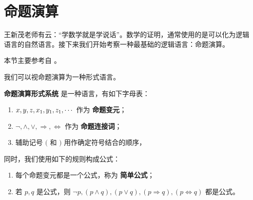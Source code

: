 \section{命题演算}

王新茂老师有云：“学数学就是学说话”。数学的证明，通常使用的是可以化为逻辑语言的自然语言。接下来我们开始考察一种最基础的逻辑语言：命题演算。

本节主要参考自 \cite[2.1]{wang18}。

我们可以视命题演算为一种形式语言。

\begin{definition}[命题演算形式系统] \label{def:命题演算形式系统}
  \textbf{命题演算形式系统} 是一种语言，有如下字母表：
  \begin{enumerate}
    \item \(x,y,z,x_1,y_1,z_1,\cdots{}\) 作为 \textbf{命题变元}；
    \item \(\lnot,\land,\lor,\Rightarrow,\Leftrightarrow\) 作为 \textbf{命题连接词}；
    \item 辅助记号 \((\) 和 \()\) 用作确定符号结合的顺序，
  \end{enumerate}
  同时，我们使用如下的规则构成公式：
  \begin{enumerate}
    \item 每个命题变元都是一个公式，称为 \textbf{简单公式}；
    \item 若 \(p,q\) 是公式，则 \(\lnot p,(p\land q),(p\lor q),(p\Rightarrow q),(p\Leftrightarrow q)\) 都是公式。
  \end{enumerate}
\end{definition}